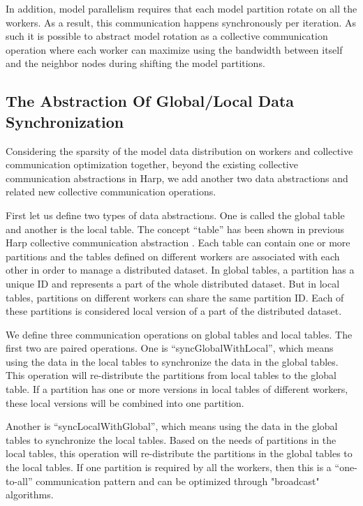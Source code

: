 \documentclass[conference]{IEEEtran}
\begin{document}
In addition, model parallelism requires that
each model partition rotate on all the workers. As a result,
this communication happens synchronously per iteration. 
As such it is possible to abstract model rotation as
a collective communication operation where each worker can maximize using
the bandwidth between itself and the neighbor nodes during shifting
the model partitions.
\subsection{The Abstraction Of Global/Local Data Synchronization}
Considering the sparsity of the model data distribution on workers 
and collective communication optimization together,  
beyond the existing collective communication abstractions in Harp,
we add another two data abstractions
and related new collective communication operations.

First let us define two types of data abstractions. 
One is called the global table and another is the local table.
The concept ``table'' has been shown in previous
Harp collective communication abstraction \cite{22}.
Each table can contain one or more partitions
and the tables defined on different workers 
are associated with each other in order to manage a distributed dataset.
In global tables, a partition has a unique ID 
and represents a part of the whole distributed dataset.
But in local tables, partitions on different workers
can share the same partition ID.
Each of these partitions is considered 
local version of a part of the distributed dataset.  

We define three communication operations on global tables and local tables.
The first two are paired operations. One is ``syncGlobalWithLocal'', which means
using the data in the local tables to synchronize the data in the global tables.
This operation will re-distribute the partitions from local tables to the global table.
If a partition has one or more versions in local tables of different workers,
these local versions will be combined into one partition. 

Another is ``syncLocalWithGlobal'', 
which means using the data in the global tables
to synchronize the local tables.
Based on the needs of partitions in the local tables,
this operation will re-distribute the partitions
in the global tables to the local tables. 
If one partition is required by all the workers,
then this is a ``one-to-all'' communication pattern 
and can be optimized through "broadcast" algorithms.
\end{document}
